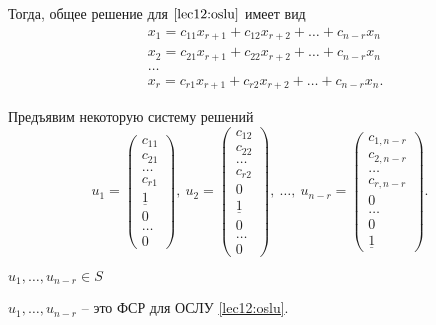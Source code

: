 Тогда, общее решение для $\eqref{lec12:oslu}$ имеет вид
\begin{align*}
    &x_1 = c_{11} x_{r + 1} + c_{12}x_{r + 2} + \dots + c_{n - r} x_n \\
    &x_2 = c_{21} x_{r + 1} + c_{22}x_{r + 2} + \dots + c_{n - r} x_n \\
    &\dots \\
    &x_r = c_{r1} x_{r + 1} + c_{r2}x_{r + 2} + \dots + c_{n - r} x_n
.\end{align*}

Предъявим некоторую систему решений
\begin{equation*}
    u_1 = \begin{pmatrix} 
        c_{11} \\
        c_{21} \\
        \dots \\
        c_{r1} \\
        \underline{1} \\
        0 \\
        \dots \\
        0
    \end{pmatrix}, \
    u_2 = \begin{pmatrix} 
        c_{12} \\
        c_{22} \\
        \dots \\
        c_{r2} \\
        0 \\
        \underline{1} \\
        0 \\
        \dots \\
        0
    \end{pmatrix}, \ \dots, \
    u_{n - r} = \begin{pmatrix} 
        c_{1, n - r} \\
        c_{2, n - r} \\
        \dots \\
        c_{r, n - r} \\
        0 \\
        \dots \\
        0 \\
        \underline{1}
    \end{pmatrix}
.\end{equation*}

$u_1, \dots, u_{n - r} \in S$

\begin{proposal}
    $u_1, \dots, u_{n - r}$ -- это ФСР для ОСЛУ \eqref{lec12:oslu}.
\end{proposal}

